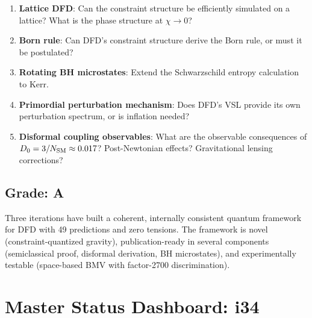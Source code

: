 \documentclass[11pt,a4paper]{article}
\begin{document}
\begin{enumerate}
\item \textbf{Lattice DFD}: Can the constraint structure be efficiently simulated on a lattice? What is the phase structure at $\chi \to 0$?
\item \textbf{Born rule}: Can DFD's constraint structure derive the Born rule, or must it be postulated?
\item \textbf{Rotating BH microstates}: Extend the Schwarzschild entropy calculation to Kerr.
\item \textbf{Primordial perturbation mechanism}: Does DFD's VSL provide its own perturbation spectrum, or is inflation needed?
\item \textbf{Disformal coupling observables}: What are the observable consequences of $D_0 = 3/N_{\rm SM} \approx 0.017$? Post-Newtonian effects? Gravitational lensing corrections?
\end{enumerate}

\subsection{Grade: A}

Three iterations have built a coherent, internally consistent quantum framework for DFD with 49 predictions and zero tensions. The framework is novel (constraint-quantized gravity), publication-ready in several components (semiclassical proof, disformal derivation, BH microstates), and experimentally testable (space-based BMV with factor-2700 discrimination).

\newpage

\section{Master Status Dashboard: i34}
\label{sec:dashboard}
\end{document}
